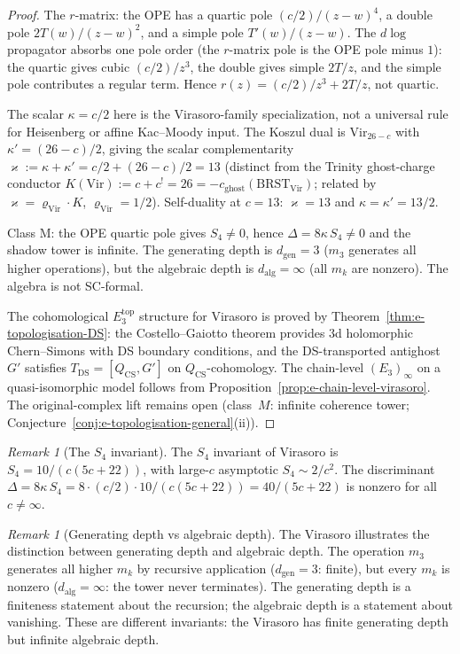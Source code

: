 \documentclass[11pt,reqno]{amsart}
\theoremstyle{definition}
\theoremstyle{remark}
\newtheorem{remark}[theorem]{Remark}
\providecommand{\Ethree}{E_3}
\providecommand{\Vir}{\ensuremath{\mathrm{Vir}}}
\providecommand{\BRST}{\ensuremath{\mathrm{BRST}}}
\begin{document}
\begin{proof}
The $r$-matrix: the OPE has a quartic pole $(c/2)/(z-w)^4$,
a double pole $2T(w)/(z-w)^2$, and a simple pole
$T'(w)/(z-w)$. The $d\log$ propagator absorbs one pole order
(the $r$-matrix pole is the OPE pole minus $1$): the
quartic gives cubic $(c/2)/z^3$, the double gives simple
$2T/z$, and the simple pole contributes a regular term. Hence
$r(z) = (c/2)/z^3 + 2T/z$, not quartic.

The scalar $\kappa = c/2$ here is the Virasoro-family specialization,
not a universal rule for Heisenberg or affine Kac--Moody input. The
Koszul dual is
$\mathrm{Vir}_{26-c}$ with $\kappa' = (26-c)/2$, giving the scalar
complementarity $\varkappa := \kappa + \kappa' = c/2 + (26-c)/2 = 13$
(distinct from the Trinity ghost-charge conductor
$K(\Vir) := c + c^! = 26 = -c_{\mathrm{ghost}}(\BRST_{\Vir})$; related
by $\varkappa = \varrho_{\Vir}\cdot K$, $\varrho_{\Vir} = 1/2$).
Self-duality at $c = 13$: $\varkappa = 13$ and
$\kappa = \kappa' = 13/2$.

Class M: the OPE quartic pole gives $S_4 \neq 0$, hence
$\Delta = 8\kappa\,S_4 \neq 0$ and the shadow tower is
infinite. The generating depth is $d_{\mathrm{gen}} = 3$
($m_3$ generates all higher operations), but the algebraic
depth is $d_{\mathrm{alg}} = \infty$ (all $m_k$ are
nonzero). The algebra is not SC-formal.

The cohomological $\Ethree^{\mathrm{top}}$ structure for
Virasoro is proved by Theorem~\ref{thm:e-topologisation-DS}:
the Costello--Gaiotto theorem provides $3$d holomorphic
Chern--Simons with DS boundary conditions, and the
DS-transported antighost $G'$ satisfies
$T_{\mathrm{DS}} = [Q_{\mathrm{CS}}, G']$ on
$Q_{\mathrm{CS}}$-cohomology.
The chain-level $(\Ethree)_\infty$ on a quasi-isomorphic
model follows from
Proposition~\ref{prop:e-chain-level-virasoro}.
The original-complex lift remains open (class~$M$:
infinite coherence tower;
Conjecture~\ref{conj:e-topologisation-general}(ii)).
\end{proof}

\begin{remark}[The $S_4$ invariant]
\label{rem:e-s4-virasoro}
The $S_4$ invariant of Virasoro is
$S_4 = 10/(c(5c + 22))$, with large-$c$ asymptotic
$S_4 \sim 2/c^2$. The discriminant
$\Delta = 8\kappa\,S_4 = 8 \cdot (c/2) \cdot 10/(c(5c+22))
= 40/(5c+22)$ is nonzero for all $c \neq \infty$.
\end{remark}

\begin{remark}[Generating depth vs algebraic depth]
\label{rem:e-depth-distinction}
The Virasoro illustrates the distinction between generating
depth and algebraic depth. The operation $m_3$ generates all
higher $m_k$ by recursive application
($d_{\mathrm{gen}} = 3$: finite), but every $m_k$ is nonzero
($d_{\mathrm{alg}} = \infty$: the tower never terminates).
The generating depth is a finiteness statement about the
recursion; the algebraic depth is a statement about
vanishing. These are different invariants: the Virasoro has
finite generating depth but infinite algebraic depth.
\end{remark}
\end{document}
